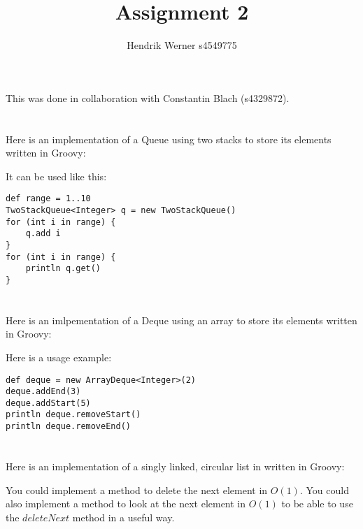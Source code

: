 \documentclass[12pt]{article}
\title {Assignment 2}
\author {Hendrik Werner s4549775}
\begin{document}
\maketitle

This was done in collaboration with Constantin Blach (s4329872).

\section{} %
Here is an implementation of a Queue using two stacks to store its elements written in Groovy:



It can be used like this:

\begin{lstlisting}
def range = 1..10
TwoStackQueue<Integer> q = new TwoStackQueue()
for (int i in range) {
    q.add i
}
for (int i in range) {
    println q.get()
}
\end{lstlisting}

\section{} %
Here is an imlpementation of a Deque using an array to store its elements written in Groovy:



Here is a usage example:

\begin{lstlisting}
def deque = new ArrayDeque<Integer>(2)
deque.addEnd(3)
deque.addStart(5)
println deque.removeStart()
println deque.removeEnd()
\end{lstlisting}

\section{} %
Here is an implementation of a singly linked, circular list in written in Groovy:



You could implement a method to delete the next element in $O(1)$. You could also implement a method to look at the next element in $O(1)$ to be able to use the $deleteNext$ method in a useful way.

\section{} %
\end{document}
